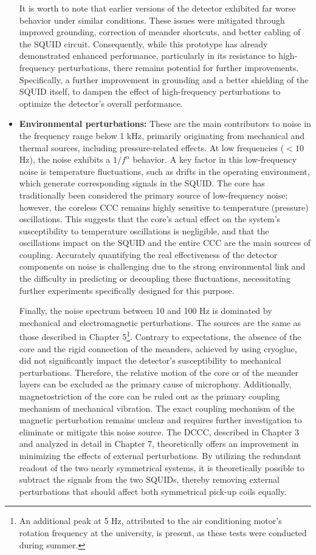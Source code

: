 \documentclass[12pt,a4paper]{report}
\begin{document}
\begin{itemize}
        	It is worth to note that earlier versions of the detector exhibited far worse behavior under similar conditions. These issues were mitigated through improved grounding, correction of meander shortcuts, and better cabling of the SQUID circuit. Consequently, while this prototype has already demonstrated enhanced performance, particularly in its resistance to high-frequency perturbations, there remains potential for further improvements. Specifically, a further improvement in grounding and a better shielding of the SQUID itself, to dampen the effect of high-frequency perturbations to optimize the detector's overall performance.
        	
        	\item \textbf{Environmental perturbations:} These are the main contributors to noise in the frequency range below 1 kHz, primarily originating from mechanical and thermal sources, including pressure-related effects. At low frequencies ($<10$ \,Hz), the noise exhibits a $1/f^\alpha$ behavior. A key factor in this low-frequency noise is temperature fluctuations, such as drifts in the operating environment, which generate corresponding signals in the SQUID. The core has traditionally been considered the primary source of low-frequency noise; however, the coreless CCC remains highly sensitive to temperature (pressure) oscillations. This suggests that the core's actual effect on the system's susceptibility to temperature oscillations is negligible, and that the oscillations impact on the SQUID and the entire CCC are the main sources of coupling. Accurately quantifying the real effectiveness of the detector components on noise is challenging due to the strong environmental link and the difficulty in predicting or decoupling these fluctuations, necessitating further experiments specifically designed for this purpose.
        	
        	Finally, the noise spectrum between 10 and 100 Hz is dominated by mechanical and electromagnetic perturbations. The sources are the same as those described in Chapter 5\footnote{An additional peak at 5 Hz, attributed to the air conditioning motor's rotation frequency at the university, is present, as these tests were conducted during summer.}. Contrary to expectations, the absence of the core and the rigid connection of the meanders, achieved by using cryoglue, did not significantly impact the detector's susceptibility to mechanical perturbations. Therefore, the relative motion of the core or of the meander layers can be excluded as the primary cause of microphony. Additionally, magnetostriction of the core can be ruled out as the primary coupling mechanism of mechanical vibration. The exact coupling mechanism of the magnetic perturbation remains unclear and requires further investigation to eliminate or mitigate this noise source. The DCCC, described in Chapter 3 and analyzed in detail in Chapter 7, theoretically offers an improvement in minimizing the effects of external perturbations. By utilizing the redundant readout of the two nearly symmetrical systems, it is theoretically possible to subtract the signals from the two SQUIDs, thereby removing external perturbations that should affect both symmetrical pick-up coils equally.
        	

\end{itemize}
\end{document}
